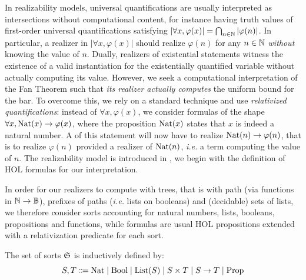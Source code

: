 \documentclass[a4paper,UKenglish,cleveref, autoref, thm-restate]{lipics-v2021}
\begin{document}
In realizability models, universal quantifications are usually interpreted as intersections without computational content, for instance having truth values of first-order universal quantifications satisfying $|\forall x,\varphi(x)|=\bigcap_{n\in\mathbb N}|\varphi(n)|$. In particular, a realizer in $|\forall x,\varphi(x)|$ should realize $\varphi(n)$ for any $n\in\mathbb N$ \emph{without} knowing the value of $n$. Dually, realizers of existential statements witness the existence of a valid instantiation for the existentially quantified variable without actually computing its value.
However, we seek a computational interpretation of the Fan Theorem such that \emph{its realizer actually computes} the uniform bound for the bar.
To overcome this, we rely on a standard technique and use \emph{relativized quantifications}: instead of $\forall x,\varphi(x)$, we consider
formulas of the shape $\forall x,\mathrm{Nat}(x) \to \varphi(x)$, where the proposition $\mathrm{Nat}(x)$ states that $x$ is indeed a natural number. A of this statement will now have to realize  $\mathrm{Nat}(n)\to \varphi(n)$, that is to realize $\varphi(n)$ provided a realizer of $\mathrm{Nat}(n)$, \emph{i.e.} a term computing the value of $n$. The realizability model is introduced in , we begin with the definition of HOL formulas for our interpretation.

In order for our realizers to compute with trees, that is with path (via functions in $\mathbb N\to\mathbb B$), prefixes of paths (\emph{i.e.} lists on booleans) and (decidable) sets of lists, we therefore consider sorts accounting for natural numbers, lists, booleans, propositions and functions, while formulas are usual HOL propositions extended with a relativization predicate for each sort.


\begin{definition}[Sorts]
  The set of sorts $\mathfrak S$ is inductively defined by:
  \[S,T \Coloneq \Nat \mid \Bool \mid \List(S)\mid S \times T \mid S \to T \mid \Prop\]
\end{definition}
\end{document}

